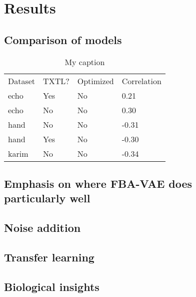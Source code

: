 \chapter{Results}\label{chap:res}

\section{Comparison of models}\label{sec:cmp}

\begin{table}[]
\centering
\caption{My caption}
\label{my-label}
\begin{tabular}{llll}
Dataset & TXTL? & Optimized & Correlation \\
echo    & Yes   & No        & 0.21        \\
echo    & No    & No        & 0.30        \\
hand    & No    & No        & -0.31       \\
hand    & Yes   & No        & -0.30       \\
karim   & No    & No        & -0.34      
\end{tabular}
\end{table}

\section{Emphasis on where FBA-VAE does particularly well}

\section{Noise addition}

\section{Transfer learning}

\section{Biological insights}
